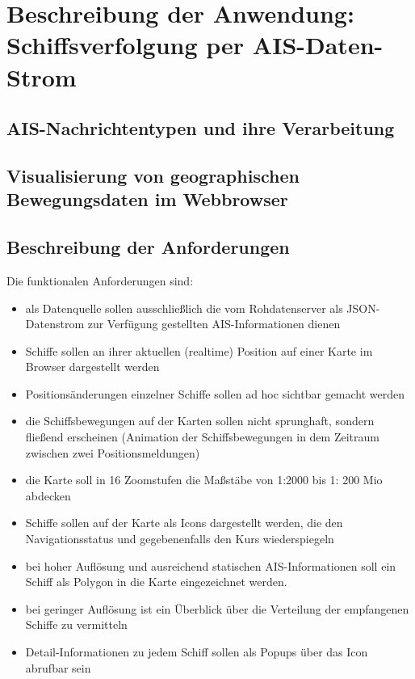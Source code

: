 \chapter{Beschreibung der Anwendung: Schiffsverfolgung per AIS-Daten-Strom}\label{c.Beschreibung der Anwendung: Schiffsverfolgung per AIS-Daten-Strom}

\section{ AIS-Nachrichtentypen und ihre Verarbeitung}\label{s.AIS-Nachrichtentypen und ihre Verarbeitung}
\section{Visualisierung von geographischen Bewegungsdaten im Webbrowser}\label{s.Visualisierung von geographischen Bewegungsdaten im Webbrowser}
\section{Beschreibung der Anforderungen}\label{s.Beschreibung der Anforderungen}


Die funktionalen Anforderungen sind:
\begin{itemize}

\item als Datenquelle sollen ausschließlich die vom Rohdatenserver als JSON-Datenstrom zur Verfügung gestellten AIS-Informationen dienen
\item Schiffe sollen an ihrer aktuellen (realtime) Position auf einer Karte im Browser dargestellt werden
\item Positionsänderungen einzelner Schiffe sollen ad hoc sichtbar gemacht werden
\item die Schiffsbewegungen auf der Karten sollen nicht sprunghaft, sondern fließend erscheinen (Animation der Schiffsbewegungen in dem Zeitraum zwischen zwei Positionsmeldungen)
\item die Karte soll in 16 Zoomstufen die Maßstäbe von 1:2000 bis 1: 200 Mio abdecken
\item Schiffe sollen auf der Karte als Icons dargestellt werden, die den Navigationsstatus und gegebenenfalls den Kurs wiederspiegeln
\item bei hoher Auflösung und ausreichend statischen AIS-Informationen soll ein Schiff als Polygon in die Karte eingezeichnet werden.
\item bei geringer Auflösung ist ein Überblick über die Verteilung der empfangenen Schiffe zu vermitteln

\item Detail-Informationen zu jedem Schiff sollen als Popups über das Icon abrufbar sein
\end{itemize}

